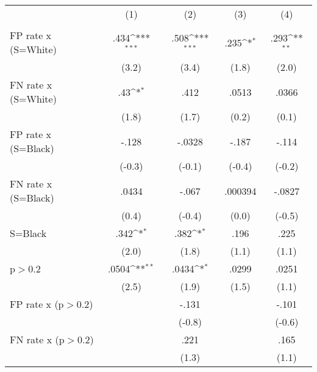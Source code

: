 {
\def\sym#1{\ifmmode^{#1}\else\(^{#1}\)\fi}
\begin{tabular}{l*{4}{c}}
\hline\hline
                &\multicolumn{1}{c}{(1)}&\multicolumn{1}{c}{(2)}&\multicolumn{1}{c}{(3)}&\multicolumn{1}{c}{(4)}\\
                &\multicolumn{1}{c}{}&\multicolumn{1}{c}{}&\multicolumn{1}{c}{}&\multicolumn{1}{c}{}\\
\hline
FP rate x (S=White)&     .434\sym{***}&     .508\sym{***}&     .235\sym{*}  &     .293\sym{**} \\
                &    (3.2)         &    (3.4)         &    (1.8)         &    (2.0)         \\
FN rate x (S=White)&      .43\sym{*}  &     .412         &    .0513         &    .0366         \\
                &    (1.8)         &    (1.7)         &    (0.2)         &    (0.1)         \\
FP rate x (S=Black)&    -.128         &   -.0328         &    -.187         &    -.114         \\
                &   (-0.3)         &   (-0.1)         &   (-0.4)         &   (-0.2)         \\
FN rate x (S=Black)&    .0434         &    -.067         &  .000394         &   -.0827         \\
                &    (0.4)         &   (-0.4)         &    (0.0)         &   (-0.5)         \\
S=Black         &     .342\sym{*}  &     .382\sym{*}  &     .196         &     .225         \\
                &    (2.0)         &    (1.8)         &    (1.1)         &    (1.1)         \\
p$>$0.2         &    .0504\sym{**} &    .0434\sym{*}  &    .0299         &    .0251         \\
                &    (2.5)         &    (1.9)         &    (1.5)         &    (1.1)         \\
FP rate x (p$>$0.2)&                  &    -.131         &                  &    -.101         \\
                &                  &   (-0.8)         &                  &   (-0.6)         \\
FN rate x (p$>$0.2)&                  &     .221         &                  &     .165         \\
                &                  &    (1.3)         &                  &    (1.1)         \\

\end{tabular}}
